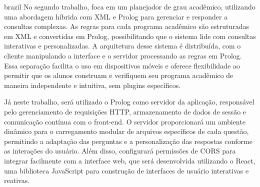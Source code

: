 \begin{otherlanguage*}{brazil}
No segundo trabalho, \textcite{neildunstan} foca em um planejador de grau acadêmico, utilizando uma abordagem híbrida com XML e Prolog para gerenciar e responder a consultas complexas. As regras para cada programa acadêmico são estruturadas em XML e convertidas em Prolog, possibilitando que o sistema lide com consultas interativas e personalizadas. A arquitetura desse sistema é distribuída, com o cliente manipulando a interface e o servidor processando as regras em Prolog. Essa separação facilita o uso em dispositivos móveis e oferece flexibilidade ao permitir que os alunos construam e verifiquem seu programa acadêmico de maneira independente e intuitiva, sem plugins específicos.

Já neste trabalho, será utilizado o Prolog como servidor da aplicação, responsável pelo gerenciamento de requisições HTTP, armazenamento de dados de sessão e comunicação contínua com o front-end. O servidor proporcionará um ambiente dinâmico para o carregamento modular de arquivos específicos de cada questão, permitindo a adaptação das perguntas e a personalização das respostas conforme as interações do usuário. Além disso, configurará permissões de CORS para integrar facilmente com a interface web, que será desenvolvida utilizando o React, uma biblioteca JavaScript para construção de interfaces de usuário interativas e reativas.

\end{otherlanguage*}